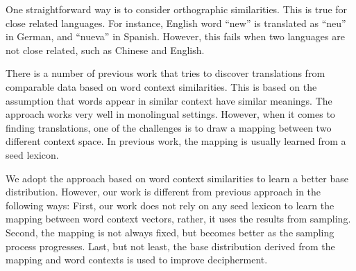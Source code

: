 One straightforward way is to consider orthographic similarities. This is true for close related languages. For instance, English word ``new'' is translated as ``neu'' in German, and ``nueva'' in Spanish. However, this fails when two languages are not close related, such as Chinese and English.

There is a number of previous work that tries to discover translations from comparable data based on word context similarities. This is based on the assumption that words appear in similar context have similar meanings. The approach works very well in monolingual settings. However, when it comes to finding translations, one of the challenges is to draw a mapping between two different context space. In previous work, the mapping is usually learned from a seed lexicon.

We adopt the approach based on word context similarities to learn a better base distribution. However, our work is different from previous approach in the following ways: First, our work does not rely on any seed lexicon to learn the mapping between word context vectors, rather, it uses the results from sampling. Second, the mapping is not always fixed, but becomes better as the sampling process progresses. Last, but not least, the base distribution derived from the mapping and word contexts is used to improve decipherment.